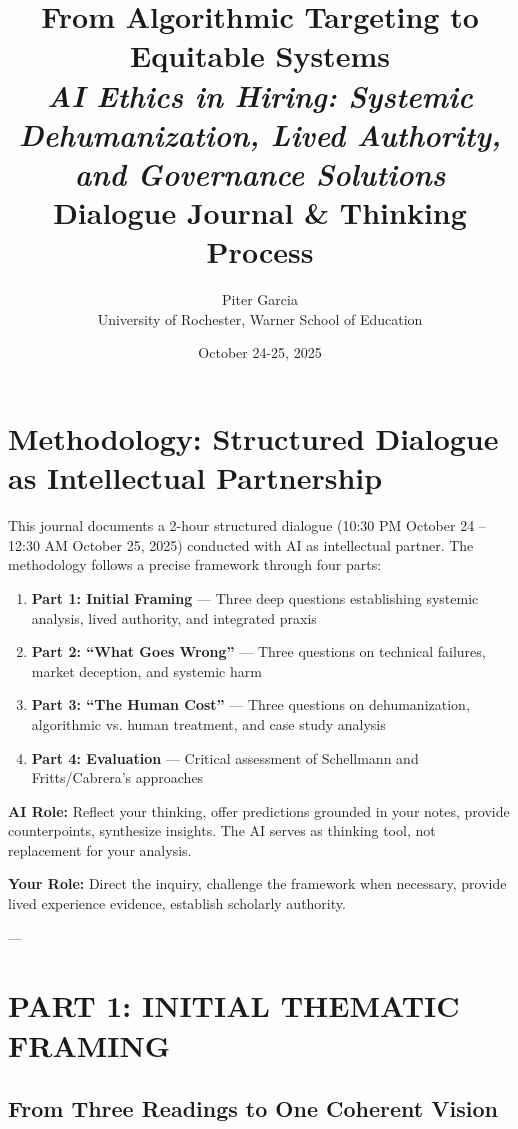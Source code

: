 \documentclass[12pt,letterpaper]{article}
\title{\textbf{\Large From Algorithmic Targeting to Equitable Systems}\\
\textit{AI Ethics in Hiring: Systemic Dehumanization, Lived Authority, and Governance Solutions}\\
\small Dialogue Journal \& Thinking Process}
\author{Piter Garcia \\ University of Rochester, Warner School of Education}
\date{October 24-25, 2025}
\begin{document}
\maketitle

\section*{Methodology: Structured Dialogue as Intellectual Partnership}

This journal documents a 2-hour structured dialogue (10:30 PM October 24 -- 12:30 AM October 25, 2025) conducted with AI as intellectual partner. The methodology follows a precise framework through four parts:

\begin{enumerate}
\item \textbf{Part 1: Initial Framing} --- Three deep questions establishing systemic analysis, lived authority, and integrated praxis
\item \textbf{Part 2: ``What Goes Wrong''} --- Three questions on technical failures, market deception, and systemic harm
\item \textbf{Part 3: ``The Human Cost''} --- Three questions on dehumanization, algorithmic vs. human treatment, and case study analysis
\item \textbf{Part 4: Evaluation} --- Critical assessment of Schellmann and Fritts/Cabrera's approaches
\end{enumerate}

\textbf{AI Role:} Reflect your thinking, offer predictions grounded in your notes, provide counterpoints, synthesize insights. The AI serves as thinking tool, not replacement for your analysis.

\textbf{Your Role:} Direct the inquiry, challenge the framework when necessary, provide lived experience evidence, establish scholarly authority.

---

\section{PART 1: INITIAL THEMATIC FRAMING}

\subsection{From Three Readings to One Coherent Vision}
\end{document}
